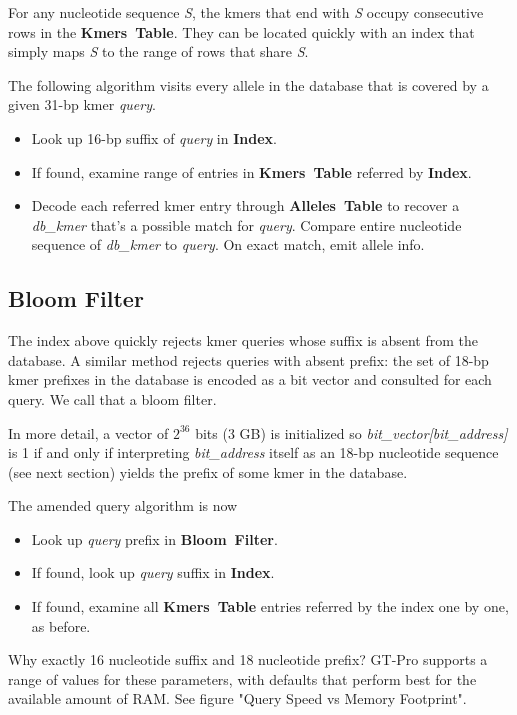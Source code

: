 \documentclass[10pt]{article}
\newcommand\datastructure[1]{\hbox{\textbf{#1}}}
\newcommand\AllelesTable{\datastructure{Alleles Table}}
\newcommand\KmersTable{\datastructure{Kmers Table}}
\newcommand\Index{\datastructure{Index}}
\newcommand\BloomFilter{\datastructure{Bloom Filter}}
\newcommand\var[1]{\hbox{\textsl{#1}}}
\begin{document}
For any nucleotide sequence \var{S}, the kmers that end with \var{S} occupy consecutive rows in the \KmersTable{}.  They can be located quickly with an index that simply maps \var{S} to the range of rows that share \var{S}.

The following algorithm visits every allele in the database that is covered by a given 31-bp kmer \var{query}.
\begin{itemize}
\item Look up 16-bp suffix of \var{query} in \Index{}.
\item If found, examine range of entries in \KmersTable{} referred by \Index{}.
\item Decode each referred kmer entry through \AllelesTable{} to recover a \var{db_kmer} that's a possible match for \var{query}.  Compare entire nucleotide sequence of \var{db_kmer} to \var{query}. On exact match, emit allele info.
\end{itemize}


\subsection{Bloom Filter}
The index above quickly rejects kmer queries whose suffix is absent from the database.  A similar method rejects queries with absent prefix:  the set of 18-bp kmer prefixes in the database is encoded as a bit vector and consulted for each query.  We call that a bloom filter.

In more detail, a vector of $\text{2}^\text{36}$ bits (3 GB) is initialized so \var{bit_vector[bit_address]} is 1 if and only if interpreting \var{bit_address} itself as an 18-bp nucleotide sequence (see next section) yields the prefix of some kmer in the database.

The amended query algorithm is now
\begin{itemize}
\item Look up \var{query} prefix in \BloomFilter{}.
\item If found, look up \var{query} suffix in \Index{}.
\item If found, examine all \KmersTable{} entries referred by the index one by one, as before.
\end{itemize}

Why exactly 16 nucleotide suffix and 18 nucleotide prefix?  GT-Pro supports a range of values for these parameters, with defaults that perform best for the available amount of RAM.  See figure "Query Speed vs Memory Footprint".
\end{document}
